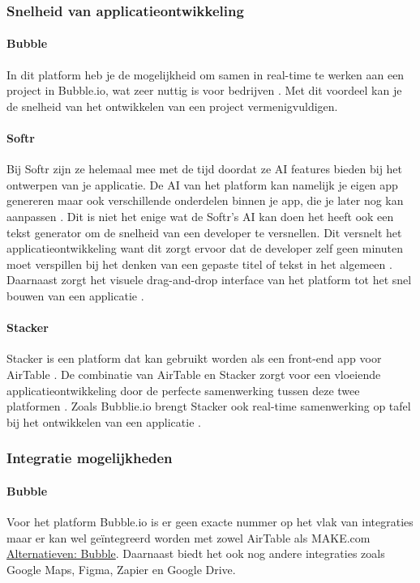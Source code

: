 \subsubsection*{Snelheid van applicatieontwikkeling}
\paragraph{Bubble}
In dit platform heb je de mogelijkheid om samen in real-time te werken aan een project in Bubble.io, wat zeer nuttig is voor bedrijven \autocite{Bubble2024b}. 
Met dit voordeel kan je de snelheid van het ontwikkelen van een project vermenigvuldigen.
\paragraph{Softr}
Bij Softr zijn ze helemaal mee met de tijd doordat ze AI features bieden bij het ontwerpen van je applicatie. 
De AI van het platform kan namelijk je eigen app genereren maar ook verschillende onderdelen binnen je app, 
die je later nog kan aanpassen \autocite{Frater2024}. Dit is niet het enige wat de Softr’s 
AI kan doen het heeft ook een tekst generator om de snelheid van een developer te versnellen. 
Dit versnelt het applicatieontwikkeling want dit zorgt ervoor dat de developer zelf geen 
minuten moet verspillen bij het denken van een gepaste titel of tekst in het algemeen \autocite{Frater2024}. 
Daarnaast zorgt het visuele drag-and-drop interface van het platform tot het snel bouwen van een applicatie \autocite{Code2023}. 
\paragraph{Stacker}
Stacker is een platform dat kan gebruikt worden als een front-end app voor AirTable \autocite{Advice}. 
De combinatie van AirTable en Stacker zorgt voor een vloeiende applicatieontwikkeling door de perfecte samenwerking tussen deze twee platformen \autocite{Advice}. 
Zoals Bubblie.io brengt Stacker ook real-time samenwerking op tafel bij het ontwikkelen van een applicatie \autocite{Allen2020}.
\subsubsection*{Integratie mogelijkheden}
\paragraph{Bubble}
Voor het platform Bubble.io is er geen exacte nummer op het vlak van integraties maar er kan wel geïntegreerd worden met zowel AirTable als MAKE.com \hyperref[subsec:alternatieve-platformen]{Alternatieven: Bubble}. 
Daarnaast biedt het ook nog andere integraties zoals Google Maps, Figma, Zapier en Google Drive.
